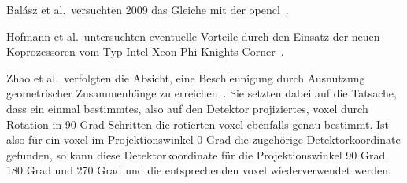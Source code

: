 Balász et al.\ versuchten 2009 das Gleiche mit der \gls{opencl}~\cite{balgab}.

Hofmann et al.\ untersuchten eventuelle Vorteile durch den Einsatz der neuen Koprozessoren vom Typ 
Intel{\textregistered} Xeon Phi{\texttrademark} {\glq}Knights Corner{\grq}~\cite{hoftrei}.

Zhao et al.\ verfolgten die Absicht, eine Beschleunigung durch Ausnutzung geometrischer Zusammenhänge zu
erreichen~\cite{zhao}. Sie setzten dabei auf die Tatsache, dass ein einmal bestimmtes, also auf den Detektor
projiziertes, \gls{voxel} durch Rotation in 90-Grad-Schritten die rotierten \gls{voxel} ebenfalls genau bestimmt. Ist
also für ein \gls{voxel} im Projektionswinkel 0 Grad die zugehörige Detektorkoordinate gefunden, so kann diese
Detektorkoordinate für die Projektionswinkel 90 Grad, 180 Grad und 270 Grad und die entsprechenden \gls{voxel}
wiederverwendet werden.
